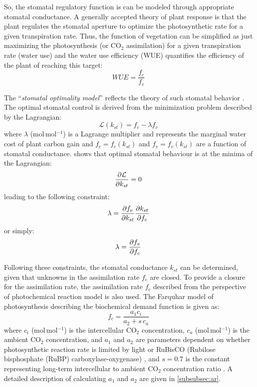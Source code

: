 So, the stomatal regulatory function is can be modeled through appropriate stomatal conductance. A generally accepted theory of plant response is that the plant regulates the stomatal aperture to optimize the photosynthetic rate for a given transpiration rate. Thus, the function of vegetation can be simplified as just maximizing the photosynthesis (or CO$_2$ assimilation) for a given transpiration rate (water use) \citep{Medlyn2011} and the water use efficiency (WUE) quantifies the efficiency of the plant of reaching this target:
\begin{equation}
\textit{WUE} = \frac{f_c}{f_v}
\label{eq:wue}
\end{equation}

The ``\textit{stomatal optimality model}'' reflects the theory of such stomatal behavior \citep{Cowan1978}. The optimal stomatal control is derived from the minimization problem described by the Lagrangian:
\begin{equation} 
\mathcal{L}(k_{st}) = f_c - \lambda f_v
\end{equation}
where $\lambda$ (mol\,mol$^{-1}$) is a Lagrange multiplier and represents the marginal water cost of plant carbon gain \citep{Medlyn2011,Katul2010,Manoli2014} and $f_c = f_c(k_{st})$ and $f_v=f_v(k_{st})$ are a function of stomatal conductance. \cite{Cowan1978} shows that optimal stomatal behaviour is at the minima of the Lagrangian:
\begin{equation}
\frac{\partial \mathcal{L}}{\partial k_{st}} = 0
\label{eq:lagrangian1}
\end{equation}
leading to the following constraint:
\begin{equation}
\lambda = \frac{\partial f_v}{\partial k_{st}}\frac{\partial k_{st}}{\partial f_c} 
\end{equation}
or simply:
\begin{equation}
\lambda = \frac{\partial f_v}{\partial f_c} 
\end{equation}

Following these constraints, the stomatal conductance $k_{\textit{st}}$ can be determined, given that unknowns in the assimilation rate $f_c$ are closed. To provide a closure for the assimilation rate, the assimilation rate $f_c$ described from the perspective of photochemical reaction model is also used. The Farquhar model of photosynthesis describing the biochemical demand function is given as:
\begin{equation}
f_c = \frac{a_1 c_i}{a_2 + s\,c_a}
\label{eq:bioassim}
\end{equation}
where $c_i$ (mol\,mol$^{-1}$)  is the intercellular CO$_2$ concentration, $c_a$ (mol\,mol$^{-1}$) is the ambient CO$_2$ concentration, and $a_1$ and $a_2$ are parameters dependent on whether photosynthetic reaction rate is limited by light or RuBisCO (Rubilose bisphosphate (RuBP) carboxylase-oxygenase) \citep{Katul2010, Farquhar1980}, and $s=0.7$ is the constant representing long-term intercellular to ambient CO$_2$ concentration ratio \citep{Volpe2013}. A detailed description of calculating $a_1$ and $a_2$ are given in \cref{subsubsec:ar}.


